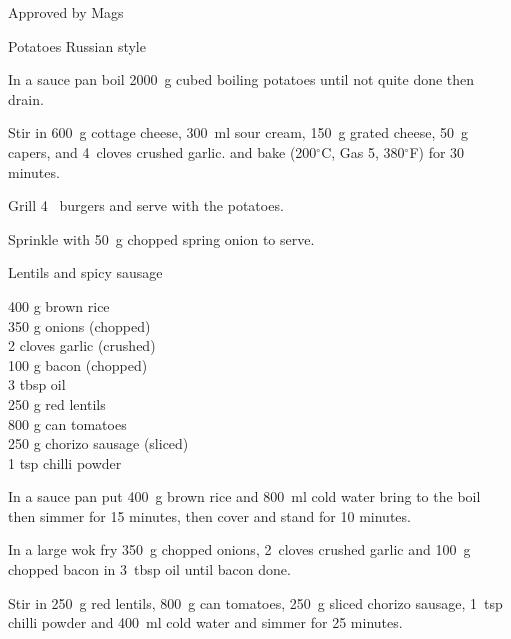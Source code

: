 \begin{menu}{Approved by Mags}
\begin{recipe}{2}{Potatoes Russian style}
\begin{ingredients}
		\end{ingredients}
	
	
    \begin{instructions}
    \item 
        In a sauce pan boil
        2000~g cubed boiling potatoes
        until not quite done
        then drain.
      \item 
        Stir in
        600~g  cottage cheese,
        300~ml  sour cream,
        150~g grated cheese,
        50~g  capers,
        and
        4~cloves crushed garlic.
        and bake 
      (200$^{\circ}$C, Gas 5, 380$^{\circ}$F)
     for 30 minutes.
      \item 
        Grill 4~  burgers and serve with the potatoes.
      \item 
        Sprinkle with 
        50~g chopped spring onion
        to serve.
      
    \end{instructions}
    \end{recipe}%
  
    \begin{recipe}{2}{Lentils and spicy sausage}%
    
		\begin{ingredients}
		400 g brown rice  \\
	350 g onions (chopped) \\
	2 cloves garlic (crushed) \\
	100 g bacon (chopped) \\
	3 tbsp oil  \\
	250 g red lentils  \\
	800 g can tomatoes  \\
	250 g chorizo sausage (sliced) \\
	1 tsp chilli powder  \\
	
		\end{ingredients}
	
    \begin{instructions}
    \item 
      In a
      sauce pan
      put
      400~g  brown rice
      and
      800~ml  cold water
      bring to the boil then simmer for 15 minutes,
      then cover and stand for 10 minutes.
    \item 
        In a large wok fry
        350~g chopped onions,
        2~cloves crushed garlic
        and
        100~g chopped bacon
        in
        3~tbsp  oil
        until bacon done.
      \item 
        Stir in
        250~g  red lentils,
        800~g  can tomatoes,
        250~g sliced chorizo sausage,
        1~tsp  chilli powder
        and
        400~ml  cold water
        and simmer for 25 minutes.
      

\end{instructions}
\end{recipe}
\end{menu}
